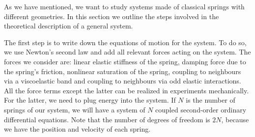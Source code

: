 \documentclass[11pt, a4paper]{article} %
\begin{document}
As we have mentioned, we want to study systems made of classical springs with different geometries. 
In this section we outline the steps involved in the theoretical description of a general system. 

The first step is to write down the equations of motion for the system. To do so, we use Newton's second law 
and add all relevant forces acting on the system. The forces we consider are: linear elastic stiffness of the spring, 
damping force due to the spring's friction, nonlinear saturation of the spring, coupling to neighbours via a viscoelastic band and coupling to 
neighbours via odd elastic interactions. All the force terms except the latter can be realized in experiments mechanically. For the latter, 
we need to plug energy into the system.  
If $N$ is the number of springs of our system, we will have a system of $N$ coupled second-order ordinary differential equations. 
Note that the number of degrees of freedom is $2N$, because we have the position and velocity of each spring. 
\end{document}
